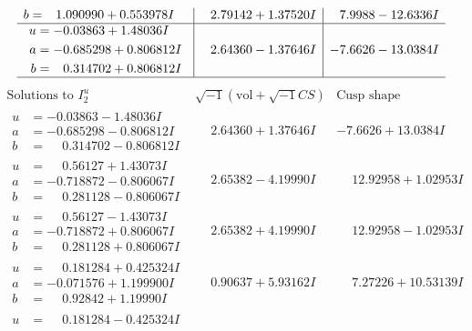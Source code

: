 \documentclass[1p]{elsarticle_modified}
\theoremstyle{definition}
\newcommand{\I}{\sqrt{-1}}
\begin{document}
$$\begin{array}{c|c|c}
\begin{aligned}
b &= \phantom{-}1.090990 + 0.553978 I\end{aligned}
 & \phantom{-}2.79142 + 1.37520 I & \phantom{-}7.9988 - 12.6336 I \\ \hline\begin{aligned}
u &= -0.03863 + 1.48036 I \\
a &= -0.685298 + 0.806812 I \\
b &= \phantom{-}0.314702 + 0.806812 I\end{aligned}
 & \phantom{-}2.64360 - 1.37646 I & -7.6626 - 13.0384 I\\
 \hline 
 \end{array}$$\newpage$$\begin{array}{c|c|c}  
\text{Solutions to }I^u_{2}& \I (\text{vol} + \sqrt{-1}CS) & \text{Cusp shape}\\
 \hline 
\begin{aligned}
u &= -0.03863 - 1.48036 I \\
a &= -0.685298 - 0.806812 I \\
b &= \phantom{-}0.314702 - 0.806812 I\end{aligned}
 & \phantom{-}2.64360 + 1.37646 I & -7.6626 + 13.0384 I \\ \hline\begin{aligned}
u &= \phantom{-}0.56127 + 1.43073 I \\
a &= -0.718872 - 0.806067 I \\
b &= \phantom{-}0.281128 - 0.806067 I\end{aligned}
 & \phantom{-}2.65382 - 4.19990 I & \phantom{-}12.92958 + 1.02953 I \\ \hline\begin{aligned}
u &= \phantom{-}0.56127 - 1.43073 I \\
a &= -0.718872 + 0.806067 I \\
b &= \phantom{-}0.281128 + 0.806067 I\end{aligned}
 & \phantom{-}2.65382 + 4.19990 I & \phantom{-}12.92958 - 1.02953 I \\ \hline\begin{aligned}
u &= \phantom{-}0.181284 + 0.425324 I \\
a &= -0.071576 + 1.199900 I \\
b &= \phantom{-}0.92842 + 1.19990 I\end{aligned}
 & \phantom{-}0.90637 + 5.93162 I & \phantom{-}7.27226 + 10.53139 I \\ \hline\begin{aligned}
u &= \phantom{-}0.181284 - 0.425324 I \\

\end{aligned}
\end{array}$$
\end{document}
